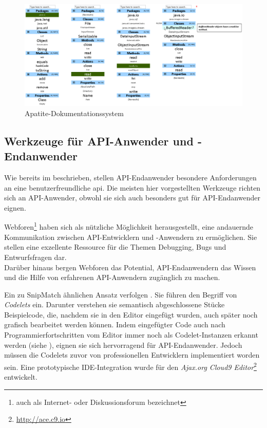 \begin{figure}[!ht]
  \centering
    \includegraphics[width=1.0\textwidth]{Figures/tools/apatite.png}
  \caption{Apatite-Dokumentationssystem \citep{Eisenberg:2010bm}}
  \label{fig:apatite}
\end{figure}




\subsection{Werkzeuge für API-Anwender und -Endanwender}

Wie bereits im  beschrieben, stellen API-Endanwender besondere Anforderungen an eine benutzerfreundliche \gls{api}. Die meisten hier vorgestellten Werkzeuge richten sich an API-Anwender, obwohl sie sich auch besonders gut für API-Endanwender eignen.

\begin{important}
Webforen\footnote{auch als Internet- oder Diskussionsforum bezeichnet} haben sich als nützliche Möglichkeit herausgestellt, eine andauernde Kommunikation zwischen API-Entwicklern und -Anwendern zu ermöglichen. Sie stellen eine exzellente Ressource für die Themen Debugging, Bugs und Entwurfsfragen dar. \citep{DaqingHou:2005ba}
\\Darüber hinaus bergen Webforen das Potential, API-Endanwendern das Wissen und die Hilfe von erfahrenen API-Anwendern zugänglich zu machen. \citep{Ko:2005cl}
\end{important}


Ein zu SnipMatch ähnlichen Ansatz verfolgen \cite{Oney:2012ge}. Sie führen den Begriff von \textit{Codelets} ein. Darunter verstehen sie semantisch abgeschlossene Stücke Beispielcode, die, nachdem sie in den Editor eingefügt wurden, auch später noch grafisch bearbeitet werden können. Indem eingefügter Code auch nach Programmierfortschritten vom Editor immer noch als Codelet-Instanzen erkannt werden (siehe ), eignen sie sich hervorragend für API-Endanwender. Jedoch müssen die Codelets zuvor von professionellen Entwicklern implementiert worden sein. Eine prototypische IDE-Integration wurde für den \textit{Ajax.org Cloud9 Editor}\footnote{\url{http://ace.c9.io}} entwickelt. 

